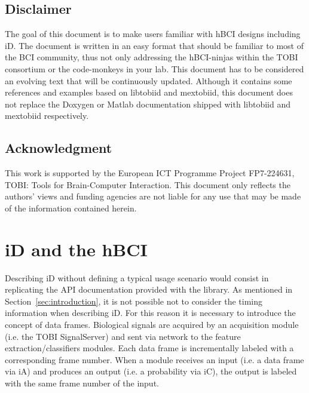 \documentclass[a4paper,10pt]{article}
\begin{document}
\subsection{Disclaimer}
\label{sec:disclaimer}
The goal of this document is to make users familiar with hBCI designs including
iD. The document is written in an easy format that should be familiar to most of
the BCI community, thus not only addressing the hBCI-ninjas within the TOBI
consortium or the code-monkeys in your lab.
This document has to be considered an evolving text that will be continuously
updated.
Although it contains some references and examples based on libtobiid and
mextobiid, this document does not replace the Doxygen or Matlab documentation
shipped with libtobiid and mextobiid respectively.

\subsection{Acknowledgment}
\label{sec:acknowledgment}
This work is supported by the European ICT Programme Project FP7-224631,
TOBI: Tools for Brain-Computer Interaction. This document only reflects the
authors' views and funding agencies are not liable for any use that may
be made of the information contained herein.

\section{iD and the hBCI}
\label{sec:hbci}
Describing iD without defining a typical usage scenario would consist in 
replicating the API documentation provided with the library.
As mentioned in Section~\ref{sec:introduction}, it is not possible not to
consider the timing information when describing iD. 
For this reason it is necessary to introduce the concept of data frames.
Biological signals are acquired by an acquisition module (i.e. the TOBI
SignalServer) and sent via network to the feature extraction/classifiers
modules. 
Each data frame is incrementally labeled with a corresponding frame number. 
When a module receives an input (i.e. a data frame via iA) and produces an
output (i.e. a probability via iC), the output is labeled with the same frame
number of the input. 
\end{document}
